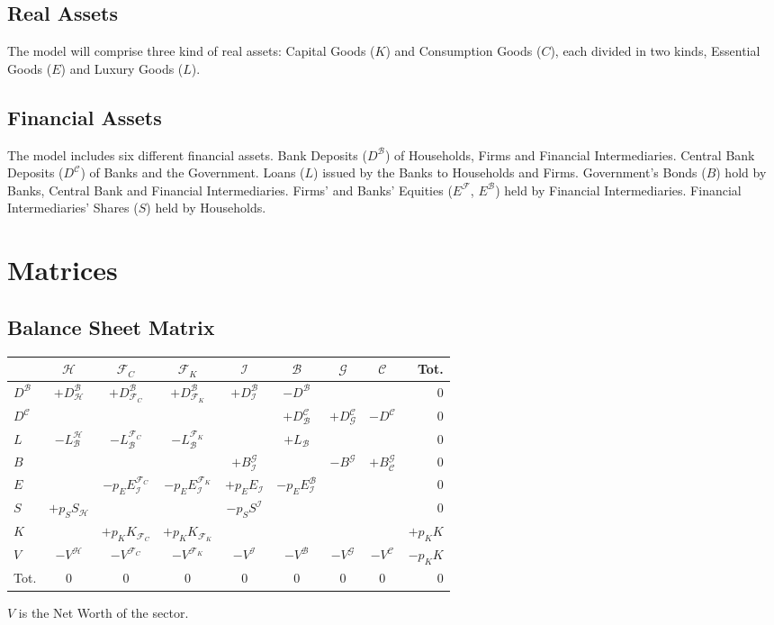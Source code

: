 \documentclass[a4paper, headings=standardclasses]{scrartcl}
\begin{document}
\subsection{Real Assets}
The model will comprise three kind of real assets: Capital Goods ($K$) and Consumption Goods ($C$), each divided in two kinds, Essential Goods ($E$) and Luxury Goods ($L$).

\subsection{Financial Assets}
The model includes six different financial assets. 
Bank Deposits ($D^\mathcal{B}$) of Households, Firms and Financial Intermediaries. 
Central Bank Deposits ($D^\mathcal{C}$) of Banks and the Government. 
Loans ($L$) issued by the Banks to Households and Firms. Government's Bonds ($B$) hold by Banks, Central Bank and Financial Intermediaries. 
Firms' and Banks' Equities ($E^\mathcal{F}$, $E^\mathcal{B}$) held by Financial Intermediaries.
Financial Intermediaries' Shares ($S$) held by Households.

\section{Matrices}
\subsection{Balance Sheet Matrix}

\begin{tabular}{l|ccccccc|r}
	\toprule
	& $\mathcal{H}$ & $\mathcal{F}_C$ & $\mathcal{F}_K$ & $\mathcal{I}$ & $\mathcal{B}$ & $\mathcal{G}$ & $\mathcal{C}$ & Tot. \\
	\midrule
	$D^\mathcal{B}$ & $+D^\mathcal{B}_\mathcal{H}$ & $+D^\mathcal{B}_{\mathcal{F}_C}$ & $+D^\mathcal{B}_{\mathcal{F}_K}$ &  $+D^\mathcal{B}_\mathcal{I}$  &  $-D^\mathcal{B}$ & & & 0 \\
	$D^\mathcal{C}$ & & & & & $+D^\mathcal{C}_\mathcal{B}$ & $+D^\mathcal{C}_\mathcal{G}$ & $-D^\mathcal{C}$ & 0 \\
	$L$ & $-L^\mathcal{H}_\mathcal{B}$ & $-L^{\mathcal{F}_C}_\mathcal{B}$ & $-L^{\mathcal{F}_K}_\mathcal{B}$ & & $+L_\mathcal{B}$ & & & 0 \\
	$B$ & & & & $+B^\mathcal{G}_\mathcal{I}$ & & $-B^\mathcal{G}$ & $+B^\mathcal{G}_\mathcal{C}$ & 0 \\
	$E$ & & $-p_E E^{\mathcal{F}_C}_\mathcal{I}$ & $-p_E E^{\mathcal{F}_K}_\mathcal{I}$ & $+p_E E_\mathcal{I}$ & $-p_E E^\mathcal{B}_\mathcal{I}$ & & & 0 \\
	$S$ & $+p_S S_\mathcal{H}$ & & & $-p_S S^\mathcal{I}$ & & & & 0 \\
	$K$ & & $+p_K K_{\mathcal{F}_C}$ & $+p_K K_{\mathcal{F}_K}$ & & & & & $+p_K K$\\
	$V$ & $-V^\mathcal{H}$ & $-V^{\mathcal{F}_C}$ & $-V^{\mathcal{F}_K}$ & $-V^\mathcal{I}$ & $-V^\mathcal{B}$ & $-V^\mathcal{G}$ & $-V^\mathcal{C}$ & $-p_K K$\\
	\midrule
	Tot. & 0 & 0 & 0 & 0 & 0 & 0 & 0 & 0 \\
	\bottomrule
\end{tabular}
\par
$V$ is the Net Worth of the sector.
\end{document}
